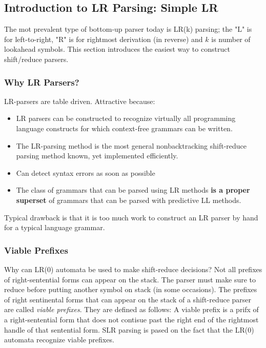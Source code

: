 \documentclass{article}
\begin{document}

\subsection{Introduction to LR Parsing: Simple LR} %
\label{sub:Introduction to LR Parsing: Simple LR}
The mot prevalent type of bottom-up parser today is LR(k) parsing; the "L" is for left-to-right, "R" is for rightmost derivation (in reverse) and $k$ is number of lookahead symbols. This section introduces the easiest way to construct shift/reduce parsers.

\subsubsection{Why LR Parsers?} %
\label{ssub:Why LR Parsers?}
LR-parsers are table driven. Attractive because:
\begin{itemize}
	\item LR parsers can be constructed to recognize virtually all programming language constructs for which context-free grammars can be written.
	\item The LR-parsing method is the most general nonbacktracking shift-reduce parsing method known, yet implemented efficiently.
	\item Can detect syntax errors as soon as possible
	\item The class of grammars that can be parsed using LR methods \textbf{is a proper superset} of grammars that can be parsed with predictive LL methods. 
\end{itemize}
Typical drawback is that it is too much work to construct an LR parser by hand for a typical language grammar.

\subsubsection{Viable Prefixes} %
\label{ssub:Viable Prefixes}
Why can LR(0) automata be used to make shift-reduce decisions? Not all prefixes of right-sentential forms can appear on the stack. The parser must make sure to reduce before putting another symbol on stack (in some occasions). The prefixes of right sentinental forms that can appear on the stack of a shift-reduce parser are called \emph{viable prefixes}. They are defined as follows: A viable prefix is a prifx of a right-sentential form that does not contisue past the right end of the rightmost handle of that sentential form. SLR parsing is pased on the fact that the LR(0) automata recognize viable prefixes.
\end{document}
